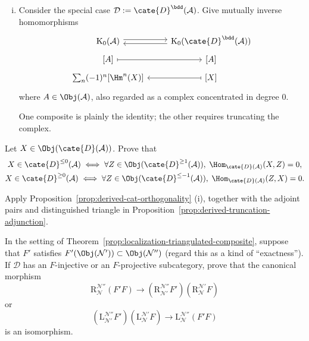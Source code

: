 \begin{Exercises}
\begin{enumerate}[(i)]
		\begin{hint}
			Send $[X]$ to $\sum_n(-1)^n[H(T^nX)]$. Apply
			Lemma~\ref{prop:K0-prep} (iv).
		\end{hint}
		\item Consider the special case
		$\mathcal{D}:=\cate{D}^{\bdd}(\mathcal{A})$. Give mutually inverse
		homomorphisms
		\[\begin{tikzcd}[row sep=tiny]
			\mathrm{K}_0(\mathcal{A}) \arrow[shift left, r] & \mathrm{K}_0(\cate{D}^{\bdd}(\mathcal{A})) \arrow[shift left, l] \\
			{[A]} \arrow[mapsto, r] & {[A]} \\
			\sum_n (-1)^n {[\Hm^n(X)]} & {[X]} \arrow[mapsto, l]
		\end{tikzcd}\]
		where $A\in\Obj(\mathcal{A})$, also regarded as a complex concentrated in
		degree $0$.
		\begin{hint}
			One composite is plainly the identity; the other requires truncating the
			complex.
		\end{hint}
	\end{enumerate}
	 

	\item Let $X\in\Obj(\cate{D}(\mathcal{A}))$. Prove that
	\begin{gather*}
		X \in \cate{D}^{\leq 0}(\mathcal{A}) \iff \forall Z \in \Obj(\cate{D}^{\geq 1}(\mathcal{A})), \; \Hom_{\cate{D}(\mathcal{A})}(X, Z) = 0, \\
		X \in \cate{D}^{\geq 0}(\mathcal{A}) \iff \forall Z \in \Obj(\cate{D}^{\leq -1}(\mathcal{A})), \; \Hom_{\cate{D}(\mathcal{A})}(Z, X) = 0.
	\end{gather*}
	\begin{hint}
		Apply Proposition~\ref{prop:derived-cat-orthogonality} (i), together with
		the adjoint pairs and distinguished triangle in
		Proposition~\ref{prop:derived-truncation-adjunction}.
	\end{hint}

	\item In the setting of
	Theorem~\ref{prop:localization-triangulated-composite}, suppose that $F'$
	satisfies $F'(\Obj(\mathcal{N}'))\subset\Obj(\mathcal{N}'')$ (regard this
	as a kind of ``exactness''). If $\mathcal{D}$ has an $F$-injective or an
	$F$-projective subcategory, prove that the canonical morphism
	\[ \mathrm{R}^{\mathcal{N}''}_{\mathcal{N}} (F' F) \to \left( \mathrm{R}^{\mathcal{N}''}_{\mathcal{N}'} F' \right) \left( \mathrm{R}^{\mathcal{N}'}_{\mathcal{N}} F \right) \]
	or
	\[ \left( \mathrm{L}^{\mathcal{N}''}_{\mathcal{N'}} F' \right) \left( \mathrm{L}^{\mathcal{N}'}_{\mathcal{N}} F \right) \to \mathrm{L}^{\mathcal{N}''}_{\mathcal{N}} (F' F) \]
	is an isomorphism.


\end{Exercises}
